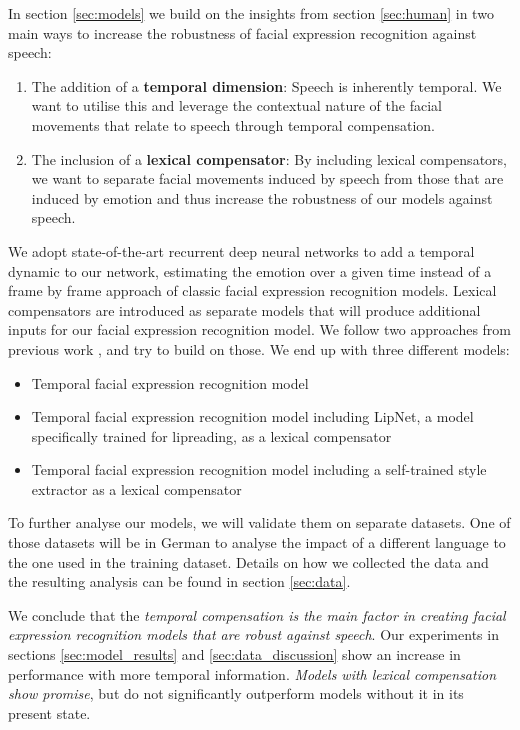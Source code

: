 In section \ref{sec:models} we build on the insights from section \ref{sec:human} in two main ways to increase the robustness of facial expression recognition against speech:

\begin{enumerate}
    \item The addition of a \textbf{temporal dimension}: Speech is inherently temporal. We want to utilise this and leverage the contextual nature of the facial movements that relate to speech through temporal compensation.
    \item The inclusion of a \textbf{lexical compensator}: By including lexical compensators, we want to separate facial movements induced by speech from those that are induced by emotion and thus increase the robustness of our models against speech.
\end{enumerate}

We adopt state-of-the-art recurrent deep neural networks to add a temporal dynamic to our network, estimating the emotion over a given time instead of a frame by frame approach of classic facial expression recognition models. Lexical compensators are introduced as separate models that will produce additional inputs for our facial expression recognition model. We follow two approaches from previous work \cite{bursic2020improving} \cite{salman2020style}, and try to build on those. We end up with three different models:

\begin{itemize}
    \item Temporal facial expression recognition model
    \item Temporal facial expression recognition model including LipNet, a model specifically trained for lipreading, as a lexical compensator \cite{bursic2020improving}
    \item Temporal facial expression recognition model including a self-trained style extractor as a lexical compensator \cite{salman2020style}
\end{itemize}

To further analyse our models, we will validate them on separate datasets. One of those datasets will be in German to analyse the impact of a different language to the one used in the training dataset. Details on how we collected the data and the resulting analysis can be found in section \ref{sec:data}.

We conclude that the \textit{temporal compensation is the main factor in creating facial expression recognition models that are robust against speech}. Our experiments in sections \ref{sec:model_results} and \ref{sec:data_discussion} show an increase in performance with more temporal information. \textit{Models with lexical compensation show promise}, but do not significantly outperform models without it in its present state.

